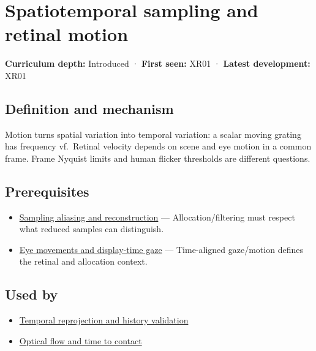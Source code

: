 \hypertarget{appendix-70895739febb}{}\label{referencestart:appendix-70895739febb}
\section{Spatiotemporal sampling and retinal motion}\label{appendix-70895739febb-spatiotemporal-sampling-and-retinal-motion}

\textbf{Curriculum depth:} Introduced · \textbf{First seen:} XR01 · \textbf{Latest development:} XR01

\subsection{Definition and mechanism}\label{appendix-70895739febb-definition-and-mechanism}

Motion turns spatial variation into temporal variation: a scalar moving grating has frequency \textbar v\textbar f.~Retinal velocity depends on scene and eye motion in a common frame. Frame Nyquist limits and human flicker thresholds are different questions.

\subsection{Prerequisites}\label{appendix-70895739febb-prerequisites}

\begin{itemize}
\tightlist
\item
  \hyperref[appendix-6a7869dd79a6]{Sampling aliasing and reconstruction} --- Allocation/filtering must respect what reduced samples can distinguish.
\item
  \hyperref[appendix-a6f2c4fe1996]{Eye movements and display-time gaze} --- Time-aligned gaze/motion defines the retinal and allocation context.
\end{itemize}

\subsection{Used by}\label{appendix-70895739febb-used-by}

\begin{itemize}
\tightlist
\item
  \hyperref[appendix-0727340a4428]{Temporal reprojection and history validation}
\item
  \hyperref[appendix-e2e73f8cd93e]{Optical flow and time to contact}
\end{itemize}

